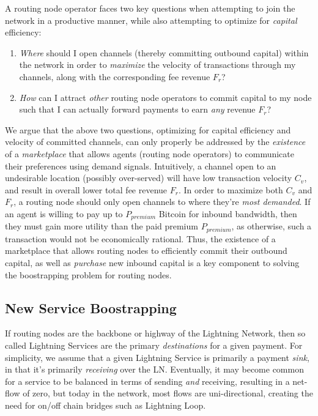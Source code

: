 \documentclass[10pt,a4paper]{article}
\theoremstyle{definition}
\begin{document}
A routing node operator faces two key questions when attempting to join the
network in a productive manner, while also attempting to optimize for
\emph{capital} efficiency:

\begin{enumerate}
        \item \emph{Where} should I open channels (thereby committing outbound
            capital) within the network in order to \emph{maximize} the
            velocity of transactions through my channels, along with the
            corresponding fee revenue $F_r$?

        \item \emph{How} can I attract \emph{other} routing node operators to
            commit capital to my node such that I can actually forward payments
            to earn \emph{any} revenue $F_r$?
\end{enumerate}

We argue that the above two questions, optimizing for capital efficiency and
velocity of committed channels, can only properly be addressed by the
\emph{existence} of a \emph{marketplace} that allows agents (routing node
operators) to communicate their preferences using demand signals. Intuitively,
a channel open to an undesirable location (possibly over-served) will have low
transaction velocity $C_{v}$, and result in overall lower total fee revenue
$F_r$. In order to maximize both $C_v$ and $F_r$, a routing node should only
open channels to where they're \emph{most demanded}. If an agent is willing to
pay up to $P_{premium}$ Bitcoin for inbound bandwidth, then they must gain more
utility than the paid premium $P_{premium}$, as otherwise, such a transaction
would not be economically rational. Thus, the existence of a marketplace that
allows routing nodes to efficiently commit their outbound capital, as well as
\emph{purchase} new inbound capital is a key component to solving the
boostrapping problem for routing nodes.


\subsection{New Service Boostrapping}

If routing nodes are the backbone or highway of the Lightning Network, then so
called Lightning Services are the primary \emph{destinations} for a given
payment. For simplicity, we assume that a given Lightning Service is primarily
a payment \emph{sink}, in that it's primarily \emph{receiving} over the LN. Eventually,
it may become common for a service to be balanced in terms of sending
\emph{and} receiving, resulting in a net-flow of zero, but today in the
network, most flows are uni-directional, creating the need for on/off
chain bridges such as Lightning Loop.
\end{document}
